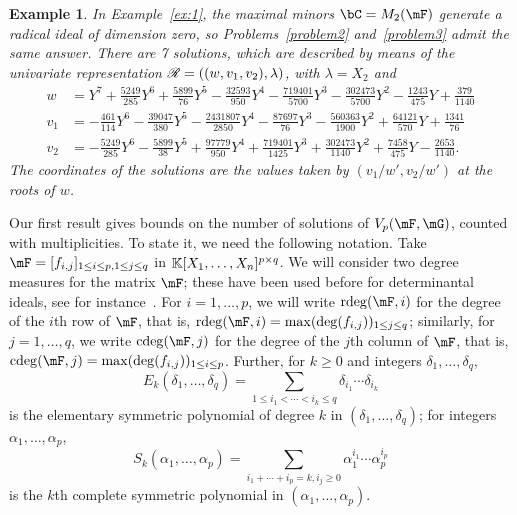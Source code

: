 \documentclass[12pt]{article}
\newtheorem{example}[definition]{Example}
\begin{document}
\begin{example}\label{ex:2}
  In Example~\ref{ex:1}, the maximal minors $\bC = M_2(\mF)$ generate a radical
  ideal of dimension zero, so Problems~\ref{problem2} and~\ref{problem3} admit the same
  answer. There are 7 solutions, which are described by means of the univariate
  representation $\mathscr{R}=((w,v_1,v_2),\lambda)$, with $\lambda = X_2$ and
{\small  \begin{align*}
w &= Y^7 + \frac{5249}{285}Y^6 + \frac{5899}{76}Y^5 - \frac{32593}{950}Y^4 - \frac{719401}{5700}Y^3 
        - \frac{302473}{5700}Y^2 - \frac{1243}{475}Y + \frac{379}{1140}\\[1mm]
v_1&= -\frac{461}{114}Y^6 - \frac{39047}{380}Y^5 - \frac{2431807}{2850}Y^4 - \frac{87697}{76}Y^3 - \frac{560363}{1900}Y^2 
      + \frac{64121}{570}Y + \frac{1341}{76}\\[1mm]
v_2 &= -\frac{5249}{285}Y^6 - \frac{5899}{38}Y^5 + \frac{97779}{950}Y^4 + \frac{719401}{1425}Y^3 
       + \frac{302473}{1140}Y^2 + \frac{7458}{475}Y - \frac{2653}{1140}.
  \end{align*}}
  The coordinates of the solutions are the values taken by $(v_1/w',v_2/w')$
  at the roots of $w$. 
\end{example}


Our first result gives bounds on the number of solutions of
$\VpFG{p}{\mF}{\mG}$, counted with multiplicities. To state it, we
need the following notation.  Take $\mF=[f_{i,j}]_{1 \le i \le p, 1
  \le j \le q}$ in $\mathbb{K}[X_1,\dots,X_n]^{p \times q}$.  We will
consider two degree measures for the matrix $\mF$; these have been used
before for determinantal ideals, see for
instance~\cite{NieRan09,MiSt04}. For $i=1,\dots,p$, we will write
$\rdeg(\mF,i)$ for the degree of the $i$th row of $\mF$, that is,
$\rdeg(\mF,i)=\max(\deg(f_{i,j}))_{1 \le j \le q}$; similarly, for
$j=1,\dots,q$, we write $\cdeg(\mF,j)$ for the degree of the $j$th
column of $\mF$, that is, $\cdeg(\mF,j)=\max(\deg(f_{i,j}))_{1 \le i
  \le p}$. Further, for $k \ge 0$ and integers $\delta_1,\dots,\delta_q$,
$$E_k(\delta_1,\dots,\delta_q)=\sum_{1\leq i_1 < \cdots < i_k \leq
  q}\delta_{i_1} \cdots \delta_{i_k}$$ is the elementary symmetric
polynomial of degree $k$ in $(\delta_1, \ldots, \delta_q)$; 
for integers $\alpha_1,\dots,\alpha_p$,
$$S_k(\alpha_1,\dots,\alpha_p) = \sum_{i_1+\cdots+i_p=k, i_j \geq
  0}\alpha_1^{i_1}\cdots\alpha_p^{i_p}$$ is the $k$th complete
symmetric polynomial in $(\alpha_1,\dots,\alpha_p)$.
\end{document}
